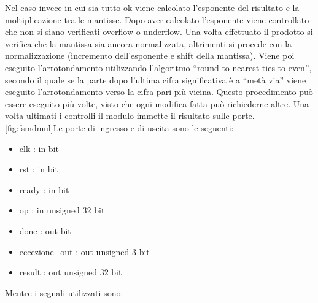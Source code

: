 \documentclass[]{IEEEtran}
\begin{document}
Nel caso invece in cui sia tutto ok viene calcolato l’esponente del risultato e la moltiplicazione tra le mantisse. Dopo aver calcolato l’esponente viene controllato che non si siano verificati overflow o underflow. Una volta effettuato il prodotto si verifica che la mantissa sia ancora normalizzata, altrimenti si procede con la normalizzazione (incremento dell’esponente e shift della mantissa). Viene poi eseguito l’arrotondamento utilizzando l’algoritmo “round to nearest ties to even”, secondo il quale se la parte dopo l’ultima cifra significativa è a “metà via” viene eseguito l’arrotondamento verso la cifra pari più vicina.  Questo procedimento può essere eseguito più volte, visto che ogni modifica fatta può richiederne altre. Una volta ultimati i controlli il modulo immette il risultato sulle porte. 
\ref{fig:fsmdmul}Le porte di ingresso e di uscita sono le seguenti:
\begin{itemize}
    \item clk : in bit
    \item rst : in bit
    \item ready : in bit
    \item op : in unsigned 32 bit
    \item done : out bit
    \item eccezione\_out : out unsigned 3 bit
    \item result : out unsigned 32 bit
\end{itemize}
Mentre i segnali utilizzati sono:
\end{document}
